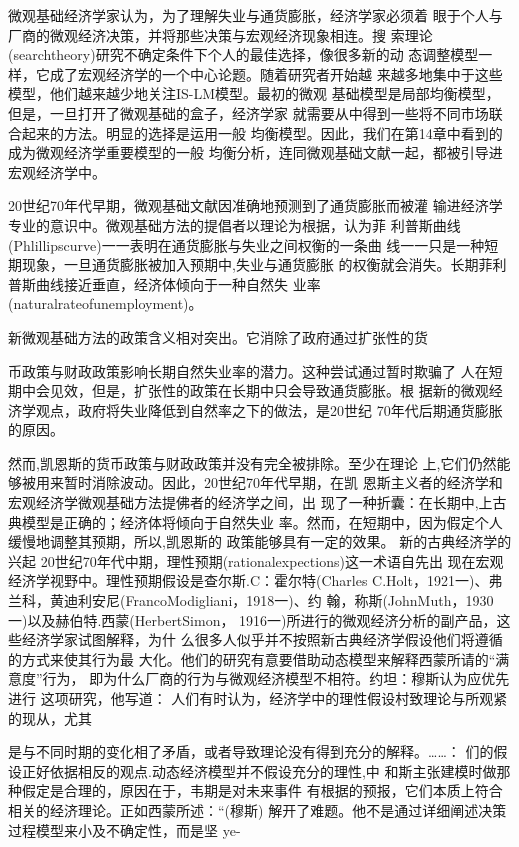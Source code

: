 微观基础经济学家认为，为了理解失业与通货膨胀，经济学家必须着
眼于个人与厂商的微观经济决策，并将那些决策与宏观经济现象相连。搜
索理论(searchtheory)研究不确定条件下个人的最佳选择，像很多新的动
态调整模型一样，它成了宏观经济学的一个中心论题。随着研究者开始越
来越多地集中于这些模型，他们越来越少地关注IS-LM模型。最初的微观
基础模型是局部均衡模型，但是，一旦打开了微观基础的盒子，经济学家
就需要从中得到一些将不同市场联合起来的方法。明显的选择是运用一般
均衡模型。因此，我们在第14章中看到的成为微观经济学重要模型的一般
均衡分析，连同微观基础文献一起，都被引导进宏观经济学中。

20世纪70年代早期，微观基础文献因准确地预测到了通货膨胀而被灌
输进经济学专业的意识中。微观基础方法的提倡者以理论为根据，认为菲
利普斯曲线(Phlillipscurve)一一表明在通货膨胀与失业之间权衡的一条曲
线一一只是一种短期现象，一旦通货膨胀被加入预期中,失业与通货膨胀
的权衡就会消失。长期菲利普斯曲线接近垂直，经济体倾向于一种自然失
业率(naturalrateofunemployment)。

新微观基础方法的政策含义相对突出。它消除了政府通过扩张性的货

币政策与财政政策影响长期自然失业率的潜力。这种尝试通过暂时欺骗了
人在短期中会见效，但是，扩张性的政策在长期中只会导致通货膨胀。根
据新的微观经济学观点，政府将失业降低到自然率之下的做法，是20世纪
70年代后期通货膨胀的原因。

然而,凯恩斯的货币政策与财政政策并没有完全被排除。至少在理论
上,它们仍然能够被用来暂时消除波动。因此，20世纪70年代早期，在凯
恩斯主义者的经济学和宏观经济学微观基础方法提佛者的经济学之间，出
现了一种折囊：在长期中,上古典模型是正确的；经济体将倾向于自然失业
率。然而，在短期中，因为假定个人缓慢地调整其预期，所以,凯恩斯的
政策能够具有一定的效果。
新的古典经济学的兴起
20世纪70年代中期，理性预期(rationalexpections)这一术语自先出
现在宏观经济学视野中。理性预期假设是查尔斯.C：霍尔特(Charles
C.Holt，1921一)、弗兰科，黄迪利安尼(FrancoModigliani，1918一)、约
翰，称斯(JohnMuth，1930一)以及赫伯特.西蒙(HerbertSimon，
1916一)所进行的微观经济分析的副产品，这些经济学家试图解释，为什
么很多人似乎并不按照新古典经济学假设他们将遵循的方式来使其行为最
大化。他们的研究有意要借助动态模型来解释西蒙所请的“满意度”行为，
即为什么厂商的行为与微观经济模型不相符。约坦：穆斯认为应优先进行
这项研究，他写道：
人们有时认为，经济学中的理性假设村致理论与所观紧的现从，尤其

是与不同时期的变化相了矛盾，或者导致理论没有得到充分的解释。……：
们的假设正好依据相反的观点.动态经济模型并不假设充分的理性,中
和斯主张建模时做那种假定是合理的，原因在于，韦期是对未来事件
有根据的预报，它们本质上符合相关的经济理论。正如西蒙所述：“(穆斯)
解开了难题。他不是通过详细阐述决策过程模型来小及不确定性，而是坚
ye-




